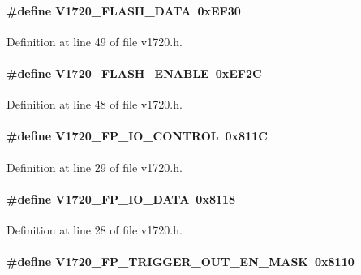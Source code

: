 \paragraph[{V1720\_\-FLASH\_\-DATA}]{\setlength{\rightskip}{0pt plus 5cm}\#define V1720\_\-FLASH\_\-DATA~0xEF30}\hfill\label{v1720_8h_a3d8020306d3c577f3cfc4201fb01bdd9}


Definition at line 49 of file v1720.h.
\paragraph[{V1720\_\-FLASH\_\-ENABLE}]{\setlength{\rightskip}{0pt plus 5cm}\#define V1720\_\-FLASH\_\-ENABLE~0xEF2C}\hfill\label{v1720_8h_ab9502939e07822f22c63c4cee176e137}


Definition at line 48 of file v1720.h.
\paragraph[{V1720\_\-FP\_\-IO\_\-CONTROL}]{\setlength{\rightskip}{0pt plus 5cm}\#define V1720\_\-FP\_\-IO\_\-CONTROL~0x811C}\hfill\label{v1720_8h_a3355785dc4ce94bffdf989c06af4d0a2}


Definition at line 29 of file v1720.h.
\paragraph[{V1720\_\-FP\_\-IO\_\-DATA}]{\setlength{\rightskip}{0pt plus 5cm}\#define V1720\_\-FP\_\-IO\_\-DATA~0x8118}\hfill\label{v1720_8h_ace6426933fa95aa0c2c55d000acd3930}


Definition at line 28 of file v1720.h.
\paragraph[{V1720\_\-FP\_\-TRIGGER\_\-OUT\_\-EN\_\-MASK}]{\setlength{\rightskip}{0pt plus 5cm}\#define V1720\_\-FP\_\-TRIGGER\_\-OUT\_\-EN\_\-MASK~0x8110}\hfill\label{v1720_8h_ab508f50142fb87c27ad5308052183df1}


